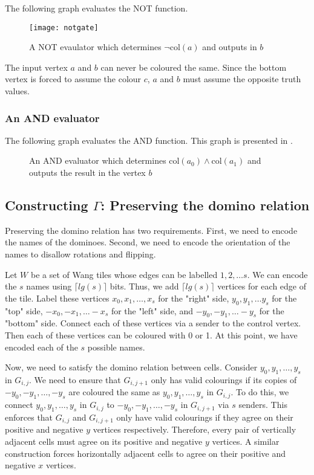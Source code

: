 \documentclass[letterpaper]{article}
\begin{document}
The following graph evaluates the NOT function.

\begin{figure}[H]
\centering
\caption{A NOT evaulator which determines $\neg \text{col}(a)$ and outputs in $b$}
\texttt{[image: notgate]}
\end{figure}

The input vertex $a$ and $b$ can never be coloured the same.
Since the bottom vertex is forced to assume the colour $c$, $a$ and $b$ must assume the opposite truth values.

\newpage
\subsubsection{An AND evaluator}

The following graph evaluates the AND function. This graph is presented in \cite{burr84}.

\begin{figure}[H]
\centering
\caption{An AND evaluator which determines $\text{col}(a_0) \wedge \text{col}(a_1)$ and outputs the result in the vertex $b$}
%
\end{figure}



\newpage
\subsection{Constructing $\Gamma$: Preserving the domino relation}
Preserving the domino relation has two requirements.
First, we need to encode the names of the dominoes.
Second, we need to encode the orientation of the names to disallow rotations and flipping.

Let $W$ be a set of Wang tiles whose edges can be labelled $1, 2, \ldots s$.
We can encode the $s$ names using $\lceil lg(s) \rceil$ bits. 
Thus, we add $\lceil lg(s) \rceil$ vertices for each edge of the tile.
Label these vertices $x_0, x_1, \ldots, x_s$ for the "right" side, $y_0, y_1, \ldots y_s$ for the "top" side, $-x_0, -x_1, \ldots -x_s$ for the "left" side, and $-y_0, -y_1, \ldots -y_s$ for the "bottom" side.
Connect each of these vertices via a sender to the control vertex.
Then each of these vertices can be coloured with 0 or 1.
At this point, we have encoded each of the $s$ possible names.

Now, we need to satisfy the domino relation between cells.
Consider $y_0, y_1, \ldots, y_s$ in $G_{i,j}$.
We need to ensure that $G_{i,j+1}$ only has valid colourings if its copies of $-y_0, -y_1, \ldots, -y_s$ are coloured the same as $y_0, y_1, \ldots, y_s$ in $G_{i,j}$.
To do this, we connect $y_0, y_1, \ldots, y_s$ in $G_{i,j}$ to $-y_0, -y_1, \ldots, -y_s$ in $G_{i,j+1}$ via $s$ senders.
This enforces that $G_{i,j}$ and $G_{i,j+1}$ only have valid colourings if they agree on their positive and negative $y$ vertices respectively. Therefore, every pair of vertically adjacent cells must agree on its positive and negative $y$ vertices.
A similar construction forces horizontally adjacent cells to agree on their positive and negative $x$ vertices.
\end{document}
